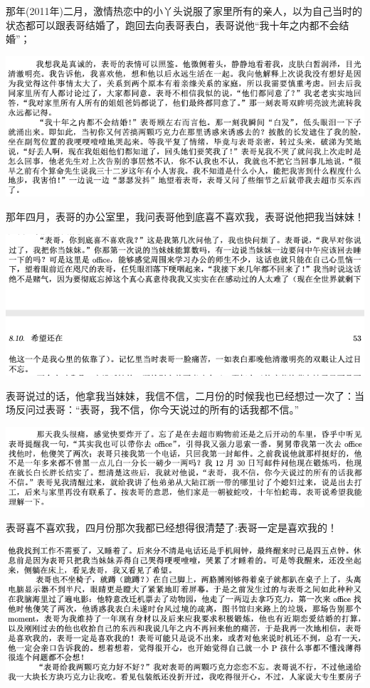 \documentclass[9pt, b5paper]{article}
\begin{document}
那年(2011年)二月，激情热恋中的小丫头说服了家里所有的亲人，以为自己当时的状态都可以跟表哥结婚了，跑回去向表哥表白，表哥说他“我十年之内都不会结婚”；

\begin{center}
\includegraphics[width=.9\linewidth]{./pic/p1p50-3.png}
\end{center}

那年四月，表哥的办公室里，我问表哥他到底喜不喜欢我，表哥说他把我当妹妹！

\begin{center}
\includegraphics[width=.9\linewidth]{./pic/p1p52-3.png}
\end{center}

表哥说过的话，他拿我当妹妹，我信不信，二月份的时候我也已经想过一次了：当场反问过表哥：“表哥，我不信，你今天说过的所有的话我都不信。”

\begin{center}
\includegraphics[width=.9\linewidth]{./pic/p1p50-4.png}
\end{center}

表哥喜不喜欢我，四月份那次我都已经想得很清楚了:表哥一定是喜欢我的！

\begin{center}
\includegraphics[width=.9\linewidth]{./pic/p1p53.png}
\end{center}
\end{document}
